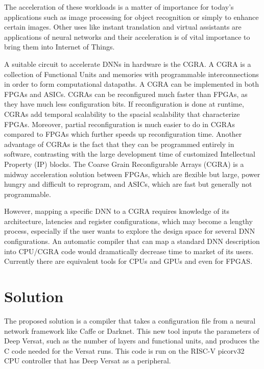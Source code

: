 The acceleration of these workloads is a matter of importance for today's
applications such as image processing for object recognition or simply to
enhance certain images. Other uses like instant translation and virtual
assistants are applications of neural networks and their acceleration is of
vital importance to bring them into Internet of Things.

A suitable circuit to accelerate DNNs in hardware is the CGRA. A CGRA is a
collection of Functional Units and memories with programmable interconnections
in order to form computational datapaths. A CGRA can be implemented in both
FPGAs and ASICs. CGRAs can be reconfigured much faster than FPGAs, as they have
much less configuration bits. If reconfiguration is done at runtime, CGRAs add
temporal scalability to the spacial scalability that characterize
FPGAs. Moreover, partial reconfiguration is much easier to do in CGRAs compared
to FPGAs which further speeds up reconfiguration time. Another advantage of
CGRAs is the fact that they can be programmed entirely in software, contrasting
with the large development time of customized Intellectual Property (IP) blocks.
The Coarse Grain Reconfigurable Arrays (CGRA) is a midway acceleration solution
between FPGAs, which are flexible but large, power hungry and difficult to
reprogram, and ASICs, which are fast but generally not programmable.

However, mapping a specific DNN to a CGRA requires knowledge of its
architecture, latencies and register configurations, which may become a lengthy
process, especially if the user wants to explore the design space for several
DNN configurations. An automatic compiler that can map a standard DNN
description into CPU/CGRA code would dramatically decrease time to market of its
users. Currently there are equivalent tools for CPUs and GPUs and
even for FPGAS.


\section{Solution}
\label{section:solution}

The proposed solution is a compiler that takes a configuration file from a
neural network framework like Caffe or Darknet. This new tool inputs the
parameters of Deep Versat, such as the number of layers and functional units,
and produces the C code needed for the Versat runs. This code is run on the
RISC-V picorv32~\cite{picorv} CPU controller that has Deep Versat as a peripheral.

